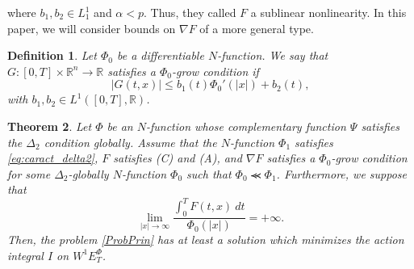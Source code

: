 \documentclass[twoside]{article}
\newtheorem{thm}{Theorem}[section]
\newtheorem{defi}[thm]{Definition}
\theoremstyle{remark}
\newcommand{\ephi}{E^{\Phi}}
\newcommand{\wphie}{W^{1}\ephi}
\newcommand{\rr}{\mathbb{R}}
\renewcommand{\leq}{\leqslant}
\begin{document}
where  $b_1,b_2 \in L^1_1$ and $\alpha<p$. Thus, they called $F$  a sublinear nonlinearity. 
In this paper, we will consider bounds on $\nabla F$ of a more general type.

\begin{defi} Let $\Phi_0$ be a differentiable $N$-function. We say that $G:[0,T]\times\rr^n\to\rr$  satisfies a $\Phi_0$-\emph{grow condition} if
\begin{equation}\label{holder_cont-mu}
  \left| G(t,x) \right|\leq b_1(t)\Phi_0'(|x|)+b_2(t),
\end{equation}
with $b_1,b_2 \in L^1([0,T],\rr)$.

\end{defi}



\begin{thm}\label{coercitividad-r} Let $\Phi$ be an $N$-function whose complementary function $\Psi$ satisfies the $\Delta_2$ condition globally. 
Assume that the $N$-function $\Phi_1$ satisfies \eqref{eq:caract_delta2}, $F$ satisfies (C) and
(A), and  $\nabla F$ satisfies a $\Phi_0$-grow condition for some 
$\Delta_2$-globally $N$-function  $\Phi_0$ such that $\Phi_0\llcurly\Phi_1$.  
Furthermore, we suppose that
\begin{equation}\label{eq:propiedad-coercividad-phi0}
\lim_{|x|\to\infty}\frac{\int_{0}^{T}F(t,x)\ dt}{\Phi_0(|x|)}=+\infty.
\end{equation}
Then,  the problem \eqref{ProbPrin} has at least a solution which minimizes the action integral $I$ on $\wphie_T$.
\end{thm}
\end{document}
